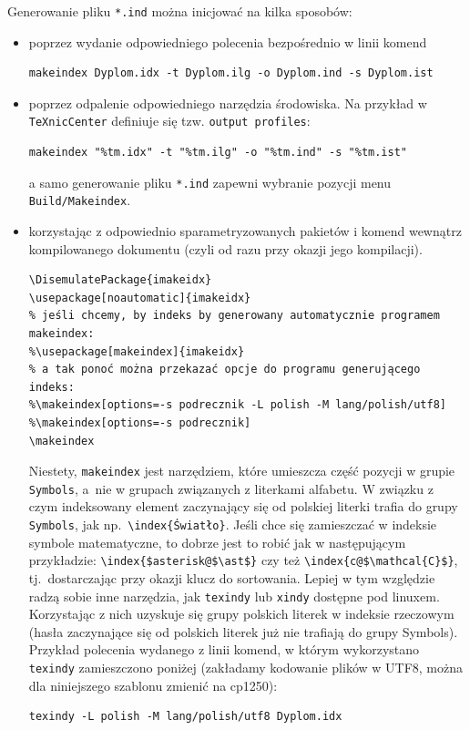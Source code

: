 Generowanie pliku \texttt{*.ind} można inicjować na kilka sposobów:
\begin{itemize}
\item poprzez wydanie odpowiedniego polecenia bezpośrednio w linii komend 
\begin{lstlisting}[basicstyle=\footnotesize\ttfamily]
makeindex Dyplom.idx -t Dyplom.ilg -o Dyplom.ind -s Dyplom.ist
\end{lstlisting}
\item poprzez odpalenie odpowiedniego narzędzia środowiska. Na przykład w \texttt{TeXnicCenter} definiuje się tzw. \texttt{output profiles}: 
\begin{lstlisting}[basicstyle=\footnotesize\ttfamily]
makeindex "%tm.idx" -t "%tm.ilg" -o "%tm.ind" -s "%tm.ist"
\end{lstlisting}
a samo generowanie pliku \texttt{*.ind} zapewni wybranie pozycji menu \texttt{Build/Makeindex}.
\item korzystając z odpowiednio sparametryzowanych pakietów i komend wewnątrz kompilowanego dokumentu (czyli od razu przy okazji jego kompilacji).
\begin{lstlisting}[basicstyle=\footnotesize\ttfamily]
\DisemulatePackage{imakeidx}
\usepackage[noautomatic]{imakeidx} 
% jeśli chcemy, by indeks by generowany automatycznie programem makeindex:
%\usepackage[makeindex]{imakeidx} 
% a tak ponoć można przekazać opcje do programu generującego indeks:
%\makeindex[options=-s podrecznik -L polish -M lang/polish/utf8] 
%\makeindex[options=-s podrecznik]
\makeindex
\end{lstlisting}

Niestety, \texttt{makeindex} jest narzędziem, które umieszcza część pozycji w grupie \texttt{Symbols}, a~nie w grupach związanych z literkami alfabetu. W związku z czym indeksowany element zaczynający się od polskiej literki trafia do grupy \texttt{Symbols}, jak np.~\verb?\index{Światło}?. Jeśli chce się zamieszczać w indeksie symbole matematyczne, to dobrze jest to robić jak w następującym przykładzie: \verb?\index{$asterisk@$\ast$}?  czy też \verb?\index{c@$\mathcal{C}$}?, tj.~dostarczając przy okazji klucz do sortowania.
Lepiej w tym względzie radzą sobie inne narzędzia, jak \texttt{texindy} lub \texttt{xindy} dostępne pod linuxem. Korzystając z nich uzyskuje się grupy polskich literek w indeksie rzeczowym (hasła zaczynające się od polskich literek już nie trafiają do grupy Symbols). Przykład polecenia wydanego z linii komend, w którym wykorzystano \texttt{texindy} zamieszczono poniżej (zakładamy kodowanie plików w UTF8, można dla niniejszego szablonu zmienić na cp1250):
\begin{lstlisting}[basicstyle=\footnotesize\ttfamily]
texindy -L polish -M lang/polish/utf8 Dyplom.idx
\end{lstlisting}


\end{itemize}
